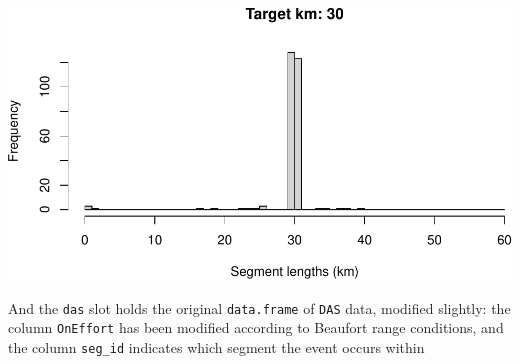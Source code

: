 \documentclass[
]{book}
\begin{document}
\includegraphics{figures/unnamed-chunk-38-1.pdf}

And the \texttt{das} slot holds the original \texttt{data.frame} of \texttt{DAS} data, modified slightly: the column \texttt{OnEffort} has been modified according to Beaufort range conditions, and the column \texttt{seg\_id} indicates which segment the event occurs within
\end{document}
